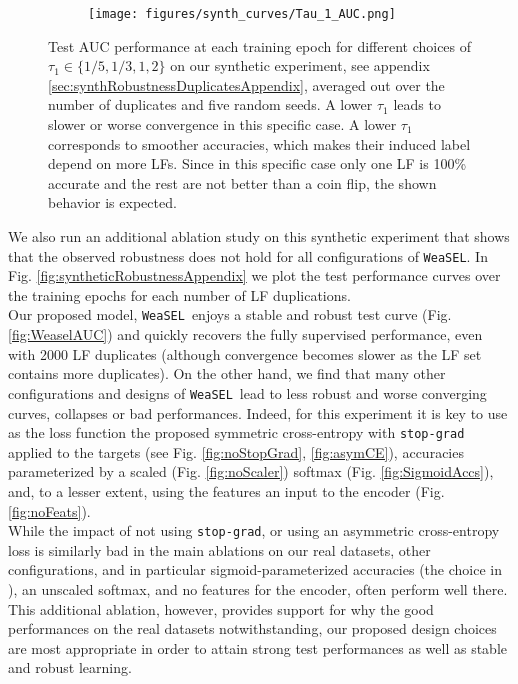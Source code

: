 \documentclass{article}
\newcommand{\weasel}{\texttt{WeaSEL}}\newcommand{\brackets}[1]{\left( #1 \right)}
\begin{document}
\begin{figure}
    \begin{subfigure}{.99\textwidth}
      \centering
      \texttt{[image: figures/synth\_curves/Tau\_1\_AUC.png]}
      \label{fig:synthRobustnessTau1Log}
    \end{subfigure}\caption{
    Test AUC performance at each training epoch for different choices of $\tau_1 \in \{1/5, 1/3, 1, 2\}$ on our synthetic experiment, see appendix \ref{sec:synthRobustnessDuplicatesAppendix}, averaged out over the number of duplicates and five random seeds. 
    A lower $\tau_1$ leads to slower or worse convergence in this specific case. A lower $\tau_1$ corresponds to smoother accuracies, which makes their induced label depend on more LFs. Since in this specific case only one LF is 100\% accurate and the rest are not better than a coin flip, the shown behavior is expected.
    }
  \label{fig:synthRobustnessTau1}
\end{figure} 
We also run an additional ablation study on this synthetic experiment that shows that the observed robustness does not hold for all configurations of \weasel. 
In Fig. \ref{fig:syntheticRobustnessAppendix} we plot the test performance curves over the training epochs for each number of LF duplications.
\\
Our proposed model, \weasel\ enjoys a stable and robust test curve (Fig. \ref{fig:WeaselAUC}) and quickly recovers the fully supervised performance, even with 2000 LF duplicates (although convergence becomes slower as the LF set contains more duplicates).
On the other hand, we find that many other configurations and designs of \weasel\ lead to less robust and worse converging curves, collapses or bad performances.
Indeed, for this experiment it is key to use as the loss function the proposed symmetric cross-entropy with \texttt{stop-grad} applied to the targets (see Fig. \ref{fig:noStopGrad}, \ref{fig:asymCE}), accuracies parameterized by a scaled (Fig. \ref{fig:noScaler}) softmax (Fig. \ref{fig:SigmoidAccs}), and, to a lesser extent, using the features an input to the encoder (Fig. \ref{fig:noFeats}).
\\
While the impact of not using \texttt{stop-grad}, or using an asymmetric cross-entropy loss is similarly bad in the main ablations on our real datasets, other configurations, and in particular sigmoid-parameterized accuracies (the choice in \cite{astra}), an unscaled softmax, and no features for the encoder, often perform well there.
This additional ablation, however, provides support for why the good performances on the real datasets notwithstanding, our proposed design choices are most appropriate in order to attain strong test performances as well as stable and robust learning.
\end{document}
